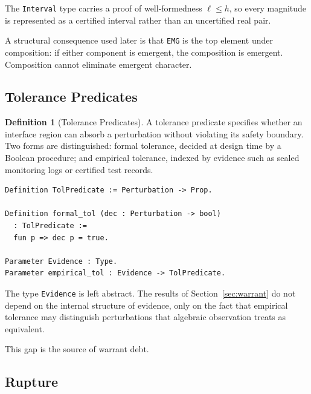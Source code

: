 \documentclass[12pt]{article}
\theoremstyle{plain}
\theoremstyle{definition}
\newtheorem{definition}[theorem]{Definition}
\theoremstyle{remark}
\begin{document}
The \texttt{Interval} type carries a proof of well-formedness
$\ell \leq h$, so every magnitude is represented as a certified
interval rather than an uncertified real pair.

A structural consequence used later is that \texttt{EMG} is the top
element under composition: if either component is emergent, the
composition is emergent.
Composition cannot eliminate emergent character.

\subsection{Tolerance Predicates}

\begin{definition}[Tolerance Predicates]

A tolerance predicate specifies whether an interface region can absorb
a perturbation without violating its safety boundary.
Two forms are distinguished: formal tolerance, decided at design time
by a Boolean procedure; and empirical tolerance, indexed by evidence
such as sealed monitoring logs or certified test records.

\end{definition}

\begin{lstlisting}[style=rocq,
caption={Tolerance predicates.}]
Definition TolPredicate := Perturbation -> Prop.

Definition formal_tol (dec : Perturbation -> bool)
  : TolPredicate :=
  fun p => dec p = true.

Parameter Evidence : Type.
Parameter empirical_tol : Evidence -> TolPredicate.
\end{lstlisting}

The type \texttt{Evidence} is left abstract.
The results of Section~\ref{sec:warrant} do not depend on the internal
structure of evidence, only on the fact that empirical tolerance may
distinguish perturbations that algebraic observation treats as
equivalent.

This gap is the source of warrant debt.

\subsection{Rupture}
\end{document}

